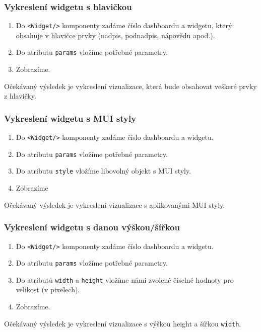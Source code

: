 \documentclass[czech, bc, kiv, he, iso690numb]{fasthesis}
\begin{document}
\subsubsection{Vykreslení widgetu s hlavičkou}
\begin{enumerate}
	\item Do \texttt{<Widget/>} komponenty zadáme číslo dashboardu a widgetu, který obsahuje v hlavičce prvky (nadpis, podnadpis, nápovědu apod.).
	\item Do atributu \texttt{params} vložíme potřebné parametry.
	\item Zobrazíme.
\end{enumerate}
Očekávaný výsledek je vykreslení vizualizace, která bude obsahovat veškeré prvky z hlavičky.

\subsubsection{Vykreslení widgetu s MUI styly}
\begin{enumerate}
	\item Do \texttt{<Widget/>} komponenty zadáme číslo dashboardu a widgetu.
	\item Do atributu \texttt{params} vložíme potřebné parametry.
	\item Do atributu \texttt{style} vložíme libovolný objekt s MUI styly.
	\item Zobrazíme
\end{enumerate}
Očekávaný výsledek je vykreslení vizualizace s aplikovanými MUI styly.

\subsubsection{Vykreslení widgetu s danou výškou/šířkou}
\begin{enumerate}
	\item Do \texttt{<Widget/>} komponenty zadáme číslo dashboardu a widgetu.
	\item Do atributu \texttt{params} vložíme potřebné parametry.
	\item Do atributů \texttt{width} a \texttt{height} vložíme námi zvolené číselné hodnoty pro velikost (v pixelech).
	\item Zobrazíme.
\end{enumerate}
Očekávaný výsledek je vykreslení vizualizace s výškou {height} a šířkou \texttt{width}.
\end{document}
